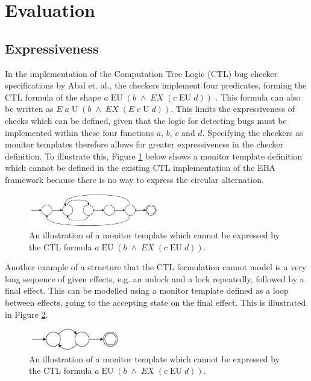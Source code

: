 \section{Evaluation}

\subsection{Expressiveness}

In the implementation of the Computation Tree Logic (CTL) bug checker specifications by Abal et. al., the checkers implement four predicates, forming the CTL formula of the shape $a\;\text{EU}\;(b\;\land\;EX\;(c\;\text{EU}\;d))$ \cite{Abal2017EffectiveBF}\cite{research-project}. This formula can also be written as $E\;a\;\text{U}\;(b\;\land\;EX\;(E\;c\;\text{U}\;d))$. This limits the expressiveness of checks which can be defined, given that the logic for detecting bugs must be implemented within these four functions $a$, $b$, $c$ and $d$. Specifying the checkers as monitor templates therefore allows for greater expressiveness in the checker definition. To illustrate this, Figure \ref{expressive-monitor} below shows a monitor template definition which cannot be defined in the existing CTL implementation of the EBA framework because there is no way to express the circular alternation.

\begin{figure}[H]
    \centering
    \includegraphics[width=0.5\textwidth]{evaluation/figures/monitor}
    \caption{An illustration of a monitor template which cannot be expressed by the CTL formula $a\;\text{EU}\;(b\;\land\;EX\;(c\;\text{EU}\;d))$.}
    \label{expressive-monitor}
\end{figure}

\newpar Another example of a structure that the CTL formulation cannot model is a very long sequence of given effects, e.g. an unlock and a lock repeatedly, followed by a final effect. This can be modelled using a monitor template defined as a loop between effects, going to the accepting state on the final effect. This is illustrated in Figure \ref{long-monitor}. 

\begin{figure}[H]
    \centering
    \includegraphics[width=0.35\textwidth]{evaluation/figures/long-monitor}
    \caption{An illustration of a monitor template which cannot be expressed by the CTL formula $a\;\text{EU}\;(b\;\land\;EX\;(c\;\text{EU}\;d))$.}
    \label{long-monitor}
\end{figure}

